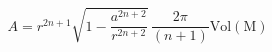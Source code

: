 \begin{equation}
A=r^{2n+1}\sqrt{1-\frac{a^{2n+2}}{r^{2n+2}}}\,\frac{2\pi}{(n+1)}
{\mathrm{Vol{(M)}}}
\end{equation}

